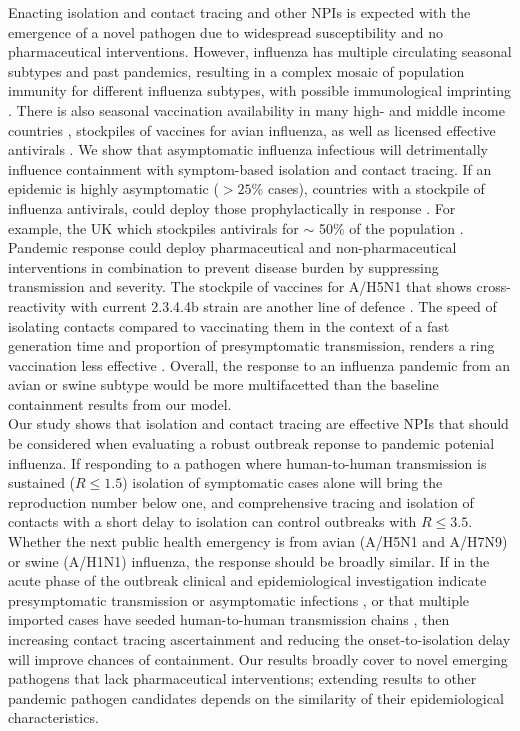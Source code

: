 \documentclass{article}
\begin{document}
Enacting isolation and contact tracing and other NPIs is expected with the emergence of a novel pathogen due to widespread susceptibility and no pharmaceutical interventions. However, influenza has multiple circulating seasonal subtypes and past pandemics, resulting in a complex mosaic of population immunity for different influenza subtypes, with possible immunological imprinting \citep{gosticPotentProtectionH5N12016}. There is also seasonal vaccination availability in many high- and middle income countries \citep{goldinSeasonalInfluenzaVaccination2024}, stockpiles of vaccines for avian influenza, as well as licensed effective antivirals \citep{krammerHighlyPathogenicAvian2025}. We show that asymptomatic influenza infectious will detrimentally influence containment with symptom-based isolation and contact tracing. If an epidemic is highly asymptomatic ($>25$\% cases), countries with a stockpile of influenza antivirals, could deploy those prophylactically in response \citep{haydenPerspectivesAntiviralUse2001}. For example, the UK which stockpiles antivirals for $\sim$ 50\% of the population \citep{WrittenQuestionsAnswers}. Pandemic response could deploy pharmaceutical and non-pharmaceutical interventions in combination to prevent disease burden by suppressing transmission and severity. The stockpile of vaccines for A/H5N1 that shows cross-reactivity with current 2.3.4.4b strain are another line of defence \citep{khuranaLicensedH5N1Vaccines2024}. The speed of isolating contacts compared to vaccinating them in the context of a fast generation time and proportion of presymptomatic transmission, renders a ring vaccination less effective \citep{kucharskiEffectivenessRingVaccination2016, whittakerQuantifyingImpactBroadly2024}. Overall, the response to an influenza pandemic from an avian or swine subtype would be more multifacetted than the baseline containment results from our model. \\

Our study shows that isolation and contact tracing are effective NPIs that should be considered when evaluating a robust outbreak reponse to pandemic potenial influenza. If responding to a pathogen where human-to-human transmission is sustained ($R \leq 1.5$) isolation of symptomatic cases alone will bring the reproduction number below one, and comprehensive tracing and isolation of contacts with a short delay to isolation can control outbreaks with $R \leq 3.5$. Whether the next public health emergency is from avian (A/H5N1 and A/H7N9) or swine (A/H1N1) influenza, the response should be broadly similar. If in the acute phase of the outbreak clinical and epidemiological investigation indicate presymptomatic transmission or asymptomatic infections \citep{liuContributionPresymptomaticInfection2020}, or that multiple imported cases have seeded human-to-human transmission chains \citep{russellEffectInternationallyImported2021}, then increasing contact tracing ascertainment and reducing the onset-to-isolation delay will improve chances of containment. Our results broadly cover to novel emerging pathogens that lack pharmaceutical interventions; extending results to other pandemic pathogen candidates depends on the similarity of their epidemiological characteristics.
\end{document}
